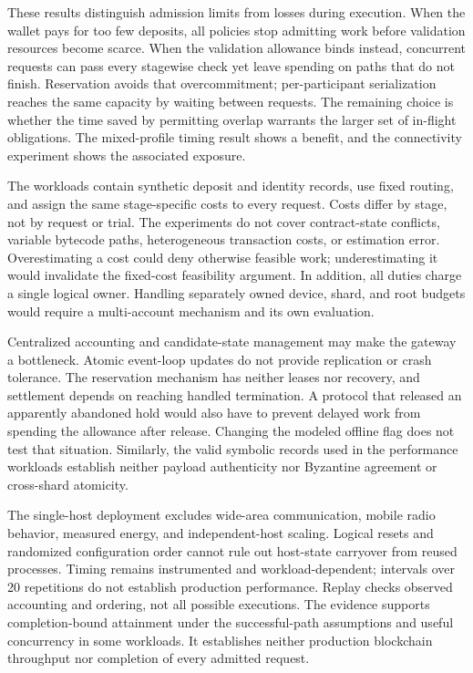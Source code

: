 These results distinguish admission limits from losses during execution.
When the wallet pays for too few deposits, all policies stop admitting work
before validation resources become scarce. When the validation allowance
binds instead, concurrent requests can pass every stagewise check yet leave
spending on paths that do not finish. Reservation avoids that overcommitment;
per-participant serialization reaches the same capacity by waiting between
requests. The remaining choice is whether the time saved by permitting
overlap warrants the larger set of in-flight obligations. The mixed-profile
timing result shows a benefit, and the connectivity experiment shows the
associated exposure.

The workloads contain synthetic deposit and identity records, use fixed
routing, and assign the same stage-specific costs to every request. Costs
differ by stage, not by request or trial. The experiments do not cover
contract-state conflicts, variable bytecode paths, heterogeneous transaction
costs, or estimation error. Overestimating a cost could deny otherwise
feasible work; underestimating it would invalidate the fixed-cost feasibility
argument. In addition, all duties charge a single logical owner. Handling
separately owned device, shard, and root budgets would require a multi-account
mechanism and its own evaluation.

Centralized accounting and candidate-state management may make the gateway
a bottleneck. Atomic event-loop updates do not provide replication or crash
tolerance. The reservation mechanism has neither leases nor recovery, and
settlement depends on reaching handled termination. A protocol that released
an apparently abandoned hold would also have to prevent delayed work from
spending the allowance after release. Changing the modeled offline flag
does not test that situation. Similarly, the valid symbolic records used
in the performance workloads establish neither payload authenticity nor
Byzantine agreement or cross-shard atomicity.

The single-host deployment excludes wide-area communication, mobile radio
behavior, measured energy, and independent-host scaling. Logical resets
and randomized configuration order cannot rule out host-state carryover
from reused processes. Timing remains instrumented and workload-dependent;
intervals over 20 repetitions do not establish production performance.
Replay checks observed accounting and ordering, not all possible executions.
The evidence supports completion-bound attainment under the successful-path
assumptions and useful concurrency in some workloads. It establishes
neither production blockchain throughput nor completion of every admitted
request.



